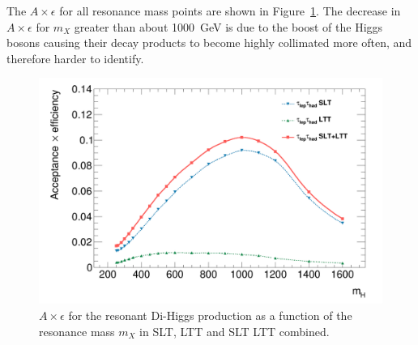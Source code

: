 The $A \times \epsilon$ for all resonance mass points are shown 
in Figure~\ref{fig:selection:acceptances}. 
The decrease in $A \times \epsilon$ 
for $m_X$ greater than about 1000~GeV is due to the boost 
of the Higgs bosons causing their decay products to become highly collimated more often,
and therefore harder to identify.

\begin{figure}[htbp]
\centering
\includegraphics[width=0.85\linewidth]{DiHiggs/plots/FF_CRs/testacc.png}
\caption{$A \times \epsilon$ for the resonant Di-Higgs production
as a function of the resonance mass $m_X$ in
SLT, LTT and SLT LTT combined.}
\label{fig:selection:acceptances}
\end{figure}

